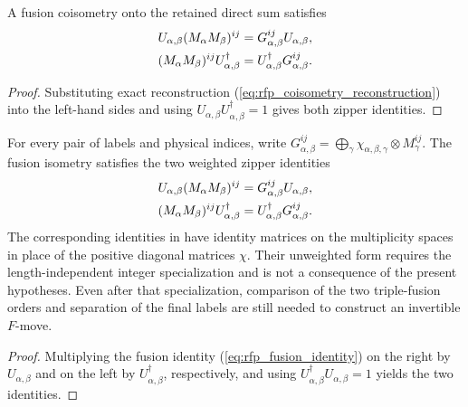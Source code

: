 \begin{lemma}
    \label{lem:mpdo_bnt_active_support_weighted_zipper}
    \leanok
    A fusion coisometry onto the retained direct sum satisfies
    \begin{align}
        U_{\alpha,\beta}(M_\alpha M_\beta)^{ij}
         & =G_{\alpha,\beta}^{ij}U_{\alpha,\beta},
        \notag                                              \\
        (M_\alpha M_\beta)^{ij}U_{\alpha,\beta}^\dagger
         & =U_{\alpha,\beta}^\dagger G_{\alpha,\beta}^{ij}.
        \notag
    \end{align}
\end{lemma}
\begin{proof}\leanok
    Substituting exact reconstruction
    (\ref{eq:rfp_coisometry_reconstruction}) into the left-hand sides and
    using $U_{\alpha,\beta}U_{\alpha,\beta}^\dagger=1$ gives both zipper
    identities.
\end{proof}

\begin{lemma}%
    \label{thm:mpdo_bnt_weighted_zipper}
    \leanok
    For every pair of labels and physical indices, write
    $G_{\alpha,\beta}^{ij}
        =\bigoplus_\gamma\chi_{\alpha,\beta,\gamma}
        \otimes M_\gamma^{ij}$.
    The fusion isometry satisfies the two weighted zipper identities
    \begin{align}
        U_{\alpha,\beta}(M_\alpha M_\beta)^{ij}
         & =G_{\alpha,\beta}^{ij}U_{\alpha,\beta},
        \notag                                              \\
        (M_\alpha M_\beta)^{ij}U_{\alpha,\beta}^\dagger
         & =U_{\alpha,\beta}^\dagger G_{\alpha,\beta}^{ij}.
        \notag
    \end{align}
    The corresponding identities in
    \cite[Equation~(21)]{Bultinck2017Anyons} have identity matrices on
    the multiplicity spaces in place of the positive diagonal matrices
    $\chi$. Their unweighted form requires the length-independent integer
    specialization and is not a consequence of the present hypotheses. Even
    after that specialization, comparison of the two triple-fusion orders and
    separation of the final labels are still needed to construct an invertible
    $F$-move.
\end{lemma}
\begin{proof}\leanok
    Multiplying the fusion identity (\ref{eq:rfp_fusion_identity}) on the
    right by $U_{\alpha,\beta}$ and on the left by
    $U_{\alpha,\beta}^\dagger$, respectively, and using
    $U_{\alpha,\beta}^\dagger U_{\alpha,\beta}=1$ yields the two identities.
\end{proof}

